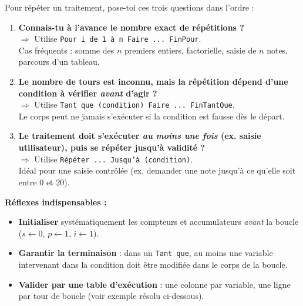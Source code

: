 \documentclass[11pt]{article}
\begin{document}
\begin{methode}
Pour répéter un traitement, pose-toi ces trois questions dans l'ordre :
\begin{enumerate}
\item \textbf{Connais-tu à l'avance le nombre exact de répétitions ?} \\
$\Rightarrow$ Utilise \texttt{Pour i de 1 à n Faire ... FinPour}. \\
Cas fréquents : somme des $n$ premiers entiers, factorielle, saisie de $n$ notes, parcours d'un tableau.
\item \textbf{Le nombre de tours est inconnu, mais la répétition dépend d'une condition à vérifier \emph{avant} d'agir ?} \\
$\Rightarrow$ Utilise \texttt{Tant que (condition) Faire ... FinTantQue}. \\
Le corps peut ne jamais s'exécuter si la condition est fausse dès le départ.
\item \textbf{Le traitement doit s'exécuter \emph{au moins une fois} (ex. saisie utilisateur), puis se répéter jusqu'à validité ?} \\
$\Rightarrow$ Utilise \texttt{Répéter ... Jusqu'à (condition)}. \\
Idéal pour une saisie contrôlée (ex. demander une note jusqu'à ce qu'elle soit entre 0 et 20).
\end{enumerate}
\textbf{Réflexes indispensables :}
\begin{itemize}
\item \textbf{Initialiser} systématiquement les compteurs et accumulateurs \emph{avant} la boucle ($s \leftarrow 0$, $p \leftarrow 1$, $i \leftarrow 1$).
\item \textbf{Garantir la terminaison} : dans un \texttt{Tant que}, au moins une variable intervenant dans la condition doit être modifiée dans le corps de la boucle.
\item \textbf{Valider par une table d'exécution} : une colonne par variable, une ligne par tour de boucle (voir exemple résolu ci-dessous).
\end{itemize}
\end{methode}
\end{document}
